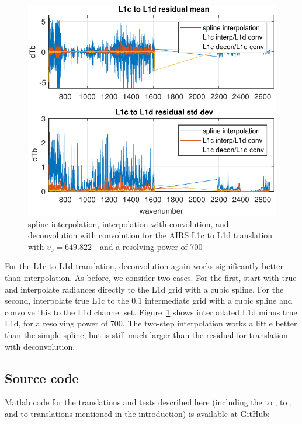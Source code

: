 \documentclass[journal]{IEEEtran}
\begin{document}
\begin{figure} %
  \centering
  \includegraphics[width=\linewidth]{figures/CtoD_interp_diff.pdf}
  \caption{spline interpolation, interpolation with convolution, 
    and deconvolution with convolution for the AIRS L1c to L1d
    translation with $v_0=649.822$~\wn\ and a resolving power of 700}
  \label{interpL1d}
\end{figure}

For the {\airs} L1c to L1d translation, deconvolution again works
significantly better than interpolation.  As before, we consider two
cases.  For the first, start with true {\airs} and interpolate
radiances directly to the L1d grid with a cubic spline.  For the
second, interpolate true L1c to the 0.1 {\wn} intermediate grid with
a cubic spline and convolve this to the L1d channel set.
Figure~\ref{interpL1d} shows interpolated L1d minus true L1d, for a
resolving power of 700.  The two-step interpolation works a little
better than the simple spline, but is still much larger than the
residual for translation with deconvolution.

\subsection{Source code}

Matlab code for the translations and tests described here (including
the {\iasi} to {\cris}, {\iasi} to {\airs}, and {\cris} to {\airs}
translations mentioned in the introduction) is available at GitHub:
\end{document}
